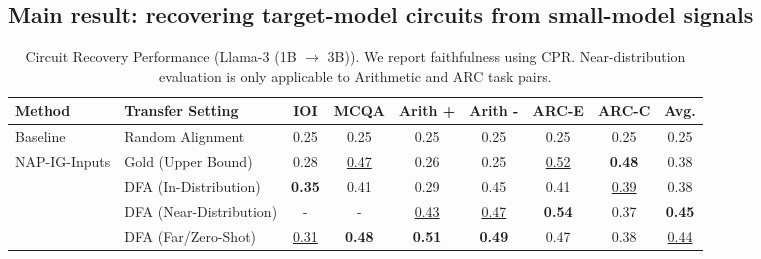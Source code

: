 \documentclass{article} %
\begin{document}
\subsection{Main result: recovering target-model circuits from small-model signals}
\label{subsec:exp_main}











\begin{table}[!t]
\centering
\small
\setlength{\tabcolsep}{3pt}
\renewcommand{\arraystretch}{1.05}
\begin{tabular}{l p{3.6cm} ccccccc}
\toprule
\textbf{Method} & \textbf{Transfer Setting} & \textbf{IOI} & \textbf{MCQA} & \textbf{Arith +} & \textbf{Arith -} & \textbf{ARC-E} & \textbf{ARC-C} & \textbf{Avg.} \\
\midrule
Baseline & Random Alignment & 0.25 & 0.25 & 0.25 & 0.25 & 0.25 & 0.25 & 0.25 \\
\midrule
\multirow{4}{*}{NAP-IG-Inputs} & Gold (Upper Bound) & 0.28 & \underline{0.47} & 0.26 & 0.25 & \underline{0.52} & \textbf{0.48} & 0.38 \\
& DFA (In-Distribution) & \textbf{0.35} & 0.41 & 0.29 & 0.45 & 0.41 & \underline{0.39} & 0.38 \\
& DFA (Near-Distribution) & - & - & \underline{0.43} & \underline{0.47} & \textbf{0.54} & 0.37 & \textbf{0.45} \\
& DFA (Far/Zero-Shot) & \underline{0.31} & \textbf{0.48} & \textbf{0.51} & \textbf{0.49} & 0.47 & 0.38 & \underline{0.44} \\
\bottomrule
\end{tabular}
\caption{Circuit Recovery Performance (Llama-3 (1B $\to$ 3B)). We report faithfulness using CPR. Near-distribution evaluation is only applicable to Arithmetic and ARC task pairs.}
\label{tab:leaderboard-llama3-1b-to-llama3-3b}
\end{table}
\end{document}
